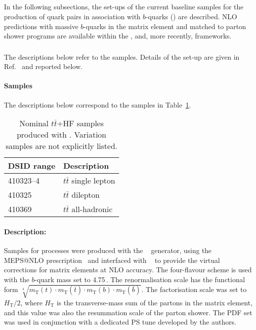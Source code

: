 \subsection[\ttHF]{\ttHF}
\label{subsec:ttHF}
In the following subsections, the set-ups of the current baseline samples for the production of \ttbar quark pairs in association with
$b$-quarks (\ttHF) are described. NLO predictions with massive $b$-quarks in the matrix element and matched to parton shower
programs are available within the \SHERPAOL, \MGNLO and, more recently, \POWHEGBOX frameworks.

\subsubsection[Sherpa]{\SHERPA}
The descriptions below refer to the \SHERPA[2.2.1] samples. 
Details of the set-up are given in Ref.~\cite{ATL-PHYS-PUB-2016-016} and reported below. 

\paragraph{Samples} 

The descriptions below correspond to the samples in Table~\ref{tab:ttHF_Sh}.

\begin{table}[htbp]
\begin{center}
\caption{Nominal $t\bar{t}$+HF samples produced with \SHERPA. Variation samples are not explicitly listed.}
\label{tab:ttHF_Sh}
\begin{tabular}{ l | l }
\hline
DSID range & Description \\
\hline
410323--4 & $t\bar{t}$ single lepton \\
410325 & $t\bar{t}$ dilepton \\
410369 & $t\bar{t}$ all-hadronic \\
\hline
\end{tabular}
\end{center}
\end{table}


\paragraph{Description:}

Samples for \ttHF processes were produced with the \SHERPA[2.2.1]~\cite{Bothmann:2019yzt} generator,
using the MEPS@NLO prescription~\cite{Hoeche:2012yf} and interfaced with \OPENLOOPS~\cite{Buccioni:2019sur,Cascioli:2011va,Denner:2016kdg}
to provide the virtual corrections for matrix elements at NLO accuracy.
The four-flavour scheme is used with the $b$-quark mass set to 4.75\,\GeV.  
The renormalisation scale \muR has the functional form 
$\sqrt[4]{m_\text{T}(t) \cdot m_\text{T}(\bar{t}) \cdot m_\text{T}(b) \cdot m_\text{T}(\bar{b})}$. The 
factorisation scale \muF was set to $H_\text{T}/2$, where $H_\text{T}$ is the transverse-mass sum of the
partons in the matrix element, and this value was also the resummation scale \muQ of the parton shower.
The \CT[10nlo] PDF set was used in conjunction with a dedicated PS tune developed by the \SHERPA authors. 

